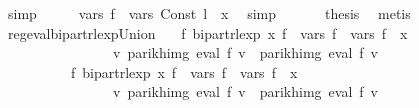 \begin{isabellebody}
\ simp\isanewline
\ \ \isamarkupfalse%
\ \isamarkupfalse%
\ {\isachardoublequoteopen}vars\ {\isacharquery}{\kern0pt}f{\isacharprime}{\kern0pt}\ {\isacharequal}{\kern0pt}\ vars\ {\isacharparenleft}{\kern0pt}Const\ l{\isacharparenright}{\kern0pt}\ {\isasymunion}\ {\isacharbraceleft}{\kern0pt}x{\isacharbraceright}{\kern0pt}{\isachardoublequoteclose}\ \isamarkupfalse%
\ simp\ \isanewline
\ \ \isamarkupfalse%
\ \isamarkupfalse%
\ {\isacharquery}{\kern0pt}thesis\ \isamarkupfalse%
\ metis\isanewline
{}\isamarkupfalse%
%
\endisatagproof
{\isafoldproof}%
%
\isadelimproof
\isanewline
%
\endisadelimproof
\isanewline
{}\isamarkupfalse%
\ reg{\isacharunderscore}{\kern0pt}eval{\isacharunderscore}{\kern0pt}bipart{\isacharunderscore}{\kern0pt}rlexp{\isacharunderscore}{\kern0pt}Union{\isacharcolon}{\kern0pt}\isanewline
\ \ \ {\isachardoublequoteopen}{\isasymexists}f{\isacharprime}{\kern0pt}{\isachardot}{\kern0pt}\ bipart{\isacharunderscore}{\kern0pt}rlexp\ x\ f{\isacharprime}{\kern0pt}\ {\isasymand}\ vars\ f{\isacharprime}{\kern0pt}\ {\isacharequal}{\kern0pt}\ vars\ f{}\ {\isasymunion}\ {\isacharbraceleft}{\kern0pt}x{\isacharbraceright}{\kern0pt}\ {\isasymand}\isanewline
\ \ \ \ \ \ \ \ \ \ \ \ \ \ \ \ {\isacharparenleft}{\kern0pt}{\isasymforall}v{\isachardot}{\kern0pt}\ parikh{\isacharunderscore}{\kern0pt}img\ {\isacharparenleft}{\kern0pt}eval\ f{}\ v{\isacharparenright}{\kern0pt}\ {\isacharequal}{\kern0pt}\ parikh{\isacharunderscore}{\kern0pt}img\ {\isacharparenleft}{\kern0pt}eval\ f{\isacharprime}{\kern0pt}\ v{\isacharparenright}{\kern0pt}{\isacharparenright}{\kern0pt}{\isachardoublequoteclose}\isanewline
\ \ \ \ \ \ \ \ \ \ {\isachardoublequoteopen}{\isasymexists}f{\isacharprime}{\kern0pt}{\isachardot}{\kern0pt}\ bipart{\isacharunderscore}{\kern0pt}rlexp\ x\ f{\isacharprime}{\kern0pt}\ {\isasymand}\ vars\ f{\isacharprime}{\kern0pt}\ {\isacharequal}{\kern0pt}\ vars\ f{}\ {\isasymunion}\ {\isacharbraceleft}{\kern0pt}x{\isacharbraceright}{\kern0pt}\ {\isasymand}\isanewline
\ \ \ \ \ \ \ \ \ \ \ \ \ \ \ \ {\isacharparenleft}{\kern0pt}{\isasymforall}v{\isachardot}{\kern0pt}\ parikh{\isacharunderscore}{\kern0pt}img\ {\isacharparenleft}{\kern0pt}eval\ f{}\ v{\isacharparenright}{\kern0pt}\ {\isacharequal}{\kern0pt}\ parikh{\isacharunderscore}{\kern0pt}img\ {\isacharparenleft}{\kern0pt}eval\ f{\isacharprime}{\kern0pt}\ v{\isacharparenright}{\kern0pt}{\isacharparenright}{\kern0pt}{\isachardoublequoteclose}\isanewline

\end{isabellebody}
